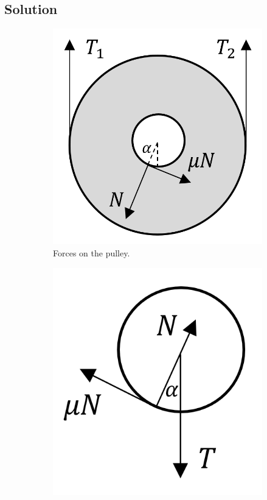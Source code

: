 \subsection*{Solution}

\begin{figure}
    \centering

    \begin{subfigure}[l]{.3\textwidth}
        \centering
        \includegraphics[width = \textwidth]{S-1}
        \caption{Forces on the pulley.}
    \end{subfigure}
    \hfill
    \begin{subfigure}[l]{.29\textwidth}
        \centering
        \includegraphics[width = \textwidth]{S-2}

\end{subfigure}
\end{figure}
